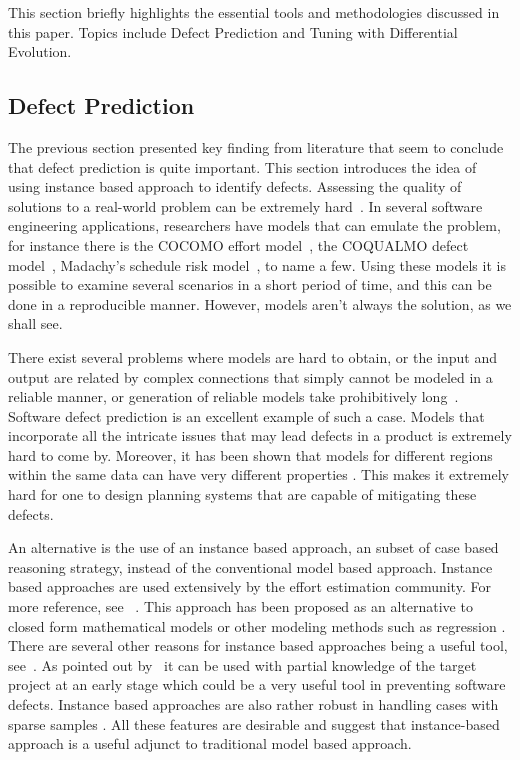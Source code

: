 \documentclass[12pt]{IEEEtran}
\begin{document}
This section briefly highlights the essential tools and methodologies discussed in this paper. Topics include Defect Prediction and Tuning with Differential Evolution.
\subsection{Defect Prediction}
The previous section presented key finding from literature that seem to conclude that defect prediction is quite important. This section introduces the idea of using instance based approach to identify defects. Assessing the quality of solutions to a real-world problem can be extremely hard~\cite{menzies2005xomo}. In several software engineering applications, researchers have models that can emulate the problem, for instance there is the COCOMO effort model~\cite[p29-57]{boehm2009software}, the COQUALMO defect model~\cite[p254-268]{boehm2009software}, Madachy’s schedule risk model~\cite[p284-291]{boehm2009software}, to name a few. Using these models it is possible to examine several scenarios in a short period of time, and this can be done in a reproducible manner. However, models aren't always the solution, as we shall see. 

There exist several problems where models are hard to obtain, or the input and output are related by complex connections that simply cannot be modeled in a reliable manner, or generation of reliable models take prohibitively long~\cite{Ludewig2003}. Software defect prediction is an excellent example of such a case. Models that incorporate all the intricate issues that may lead defects in a product is extremely hard to come by. Moreover, it has been shown that models for different regions within the same data can have very different properties \cite{localvsglobal}. This makes it extremely hard for one to design planning systems that are capable of mitigating these defects.

An alternative is the use of an instance based approach, an subset of case based reasoning strategy, instead of the conventional model based approach. Instance based approaches are used extensively by the effort estimation community. For more reference, see ~\cite{keung2008analogy, 6600685, walkerden1999empirical, shepperd1997estimating, kocaguneli2010use}. This approach has been proposed as an alternative to closed form mathematical models or other modeling methods such as regression \cite{keung2008analogy}. There are several other reasons for instance based approaches being a useful tool, see~\cite{6600685}. As pointed out by~\cite{walkerden1999empirical} it can be used with partial knowledge of the target project at an early stage which could be a very useful tool in preventing software defects. Instance based approaches are also rather robust in handling cases with sparse samples \cite{1438374}. All these features are desirable and suggest that instance-based approach is a useful adjunct to traditional model based approach. 
 
\end{document}
